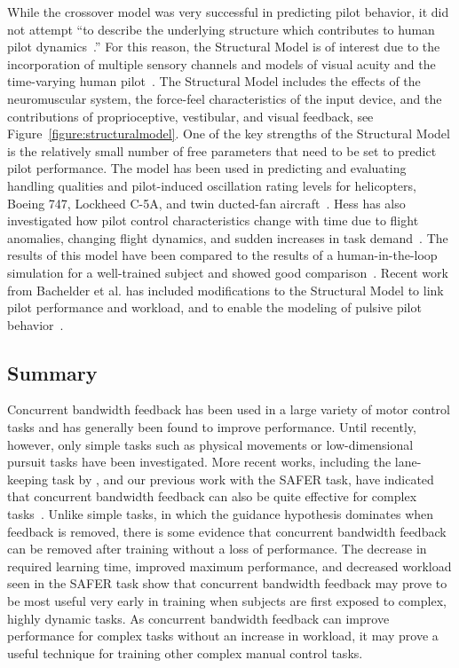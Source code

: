 While the crossover model was very successful in predicting pilot behavior, it did not attempt ``to describe the underlying structure which contributes to human pilot dynamics~\citep{hess_structural_1980}.''
For this reason, the Structural Model is of interest due to the incorporation of multiple sensory channels and models of visual acuity and the time-varying human pilot~\citep{hess_modeling_2009}.
The Structural Model includes the effects of the neuromuscular system, the force-feel characteristics of the input device, and the contributions of proprioceptive, vestibular, and visual feedback, see Figure~\ref{figure:structuralmodel}.
One of the key strengths of the Structural Model is the relatively small number of free parameters that need to be set to predict pilot performance.
The model has been used in predicting and evaluating handling qualities and pilot-induced oscillation rating levels for helicopters, Boeing 747, Lockheed C-5A, and twin ducted-fan aircraft~\citep{hess_analytical_2013, andreea-irina_prediction_2014, grant_handling_2015}.
Hess has also investigated how pilot control characteristics change with time due to flight anomalies, changing flight dynamics, and sudden increases in task demand~\citep{hess_modeling_2009, hess_modeling_2016}.
The results of this model have been compared to the results of a human-in-the-loop simulation for a well-trained subject and showed good comparison~\citep{hess_modeling_2016}.
Recent work from Bachelder et al. has included modifications to the Structural Model to link pilot performance and workload, and to enable the modeling of pulsive pilot behavior~\citep{bachelder_modeling_2017, bachelder_linking_2018}.

\subsection{Summary}
Concurrent bandwidth feedback has been used in a large variety of motor control tasks and has generally been found to improve performance.
Until recently, however, only simple tasks such as physical movements or low-dimensional pursuit tasks have been investigated.
More recent works, including the lane-keeping task by \citeauthor{de_groot_effect_2011}, and our previous work with the SAFER task, have indicated that concurrent bandwidth feedback can also be quite effective for complex tasks~\citep{karasinski_real-time_2017}.
Unlike simple tasks, in which the guidance hypothesis dominates when feedback is removed, there is some evidence that concurrent bandwidth feedback can be removed after training without a loss of performance.
The decrease in required learning time, improved maximum performance, and decreased workload seen in the SAFER task show that concurrent bandwidth feedback may prove to be most useful very early in training when subjects are first exposed to complex, highly dynamic tasks.
As concurrent bandwidth feedback can improve performance for complex tasks without an increase in workload, it may prove a useful technique for training other complex manual control tasks.

